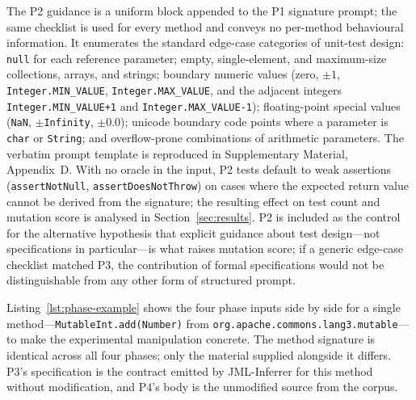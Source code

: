 The P2 guidance is a uniform block appended to the P1 signature prompt; the same checklist is used for every method and conveys no per-method behavioural information. It enumerates the standard edge-case categories of unit-test design: \texttt{null} for each reference parameter; empty, single-element, and maximum-size collections, arrays, and strings; boundary numeric values (zero, $\pm 1$, \texttt{Integer.MIN\_VALUE}, \texttt{Integer.MAX\_VALUE}, and the adjacent integers \texttt{Integer.MIN\_VALUE+1} and \texttt{Integer.MAX\_VALUE-1}); floating-point special values (\texttt{NaN}, $\pm$\texttt{Infinity}, $\pm 0.0$); unicode boundary code points where a parameter is \texttt{char} or \texttt{String}; and overflow-prone combinations of arithmetic parameters. The verbatim prompt template is reproduced in Supplementary Material, Appendix~D. With no oracle in the input, P2 tests default to weak assertions (\texttt{assertNotNull}, \texttt{assertDoesNotThrow}) on cases where the expected return value cannot be derived from the signature; the resulting effect on test count and mutation score is analysed in Section~\ref{sec:results}. P2 is included as the control for the alternative hypothesis that explicit guidance about test design---not specifications in particular---is what raises mutation score; if a generic edge-case checklist matched P3, the contribution of formal specifications would not be distinguishable from any other form of structured prompt.

Listing~\ref{lst:phase-example} shows the four phase inputs side by side for a single method---\texttt{MutableInt.add(Number)} from \texttt{org.apache.commons.lang3.mutable}---to make the experimental manipulation concrete. The method signature is identical across all four phases; only the material supplied alongside it differs. P3's specification is the contract emitted by JML-Inferrer for this method without modification, and P4's body is the unmodified source from the corpus.

